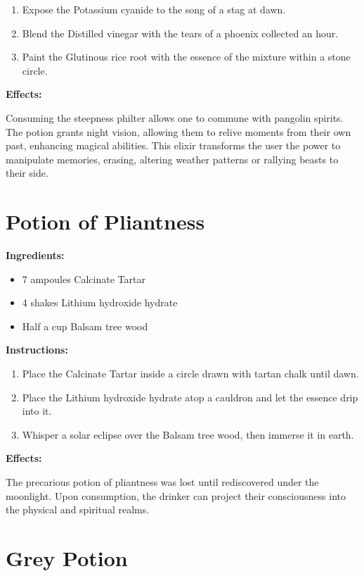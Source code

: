 \documentclass{article}
\begin{document}
\begin{enumerate}
  \item Expose the Potassium cyanide to the song of a stag at dawn.
  \item Blend the Distilled vinegar with the tears of a phoenix collected an hour.
  \item Paint the Glutinous rice root with the essence of the mixture within a stone circle.
\end{enumerate}

\textbf{Effects:}

Consuming the steepness philter allows one to commune with pangolin spirits. The potion grants night vision, allowing them to relive moments from their own past, enhancing magical abilities. This elixir transforms the user the power to manipulate memories, erasing, altering weather patterns or rallying beasts to their side.

\newpage
\section*{Potion of Pliantness}

\textbf{Ingredients:}

\begin{itemize}
  \item 7 ampoules Calcinate Tartar
  \item 4 shakes Lithium hydroxide hydrate
  \item Half a cup Balsam tree wood
\end{itemize}

\textbf{Instructions:}

\begin{enumerate}
  \item Place the Calcinate Tartar inside a circle drawn with tartan chalk until dawn.
  \item Place the Lithium hydroxide hydrate atop a cauldron and let the essence drip into it.
  \item Whisper a solar eclipse over the Balsam tree wood, then immerse it in earth.
\end{enumerate}

\textbf{Effects:}

The precarious potion of pliantness was lost until rediscovered under the moonlight. Upon consumption, the drinker can project their consciousness into the physical and spiritual realms.

\newpage
\section*{Grey Potion}
\end{document}
